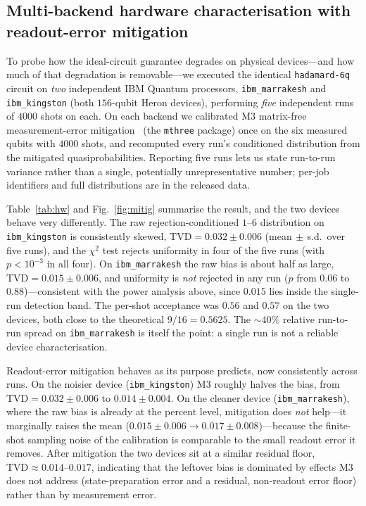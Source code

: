 \documentclass[journal]{IEEEtran}
\begin{document}
\subsection{Multi-backend hardware characterisation with readout-error mitigation}
\label{sec:hw}

To probe how the ideal-circuit guarantee degrades on physical devices---and how much of that degradation is removable---we executed the identical \texttt{hadamard-6q} circuit on \emph{two} independent IBM Quantum processors, \texttt{ibm\_marrakesh} and \texttt{ibm\_kingston} (both $156$-qubit Heron devices), performing \emph{five} independent runs of $4000$ shots on each. On each backend we calibrated M3 matrix-free measurement-error mitigation~\cite{nation2021m3} (the \texttt{mthree} package) once on the six measured qubits with $4000$ shots, and recomputed every run's conditioned distribution from the mitigated quasiprobabilities. Reporting five runs lets us state run-to-run variance rather than a single, potentially unrepresentative number; per-job identifiers and full distributions are in the released data.

Table~\ref{tab:hw} and Fig.~\ref{fig:mitig} summarise the result, and the two devices behave very differently. The raw rejection-conditioned $1$--$6$ distribution on \texttt{ibm\_kingston} is consistently skewed, $\mathrm{TVD}=0.032\pm0.006$ (mean$\,\pm\,$s.d.\ over five runs), and the $\chi^2$ test rejects uniformity in four of the five runs (with $p<10^{-3}$ in all four). On \texttt{ibm\_marrakesh} the raw bias is about half as large, $\mathrm{TVD}=0.015\pm0.006$, and uniformity is \emph{not} rejected in any run ($p$ from $0.06$ to $0.88$)---consistent with the power analysis above, since $0.015$ lies inside the single-run detection band. The per-shot acceptance was $0.56$ and $0.57$ on the two devices, both close to the theoretical $9/16=0.5625$. The $\sim\!40\%$ relative run-to-run spread on \texttt{ibm\_marrakesh} is itself the point: a single run is not a reliable device characterisation.

Readout-error mitigation behaves as its purpose predicts, now consistently across runs. On the noisier device (\texttt{ibm\_kingston}) M3 roughly halves the bias, from $\mathrm{TVD}=0.032\pm0.006$ to $0.014\pm0.004$. On the cleaner device (\texttt{ibm\_marrakesh}), where the raw bias is already at the percent level, mitigation does \emph{not} help---it marginally raises the mean ($0.015\pm0.006\to0.017\pm0.008$)---because the finite-shot sampling noise of the calibration is comparable to the small readout error it removes. After mitigation the two devices sit at a similar residual floor, $\mathrm{TVD}\approx0.014$--$0.017$, indicating that the leftover bias is dominated by effects M3 does not address (state-preparation error and a residual, non-readout error floor) rather than by measurement error.
\end{document}
